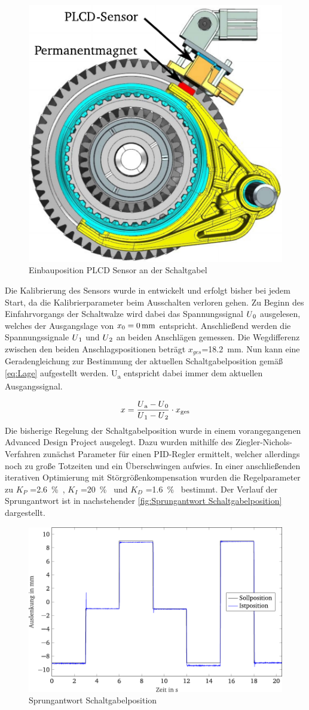 \begin{figure}[h]
	\centering
		\includegraphics[width=0.35\columnwidth]{Bilder/Sensor.pdf}
	\caption{Einbauposition PLCD Sensor an der Schaltgabel \cite[S.14]{adp}}
	\label{fig:Sensor}
\end{figure} \noindent
Die Kalibrierung des Sensors wurde in \cite[S.24f]{messtechnik} entwickelt und erfolgt bisher bei jedem Start, da die Kalibrierparameter beim Ausschalten verloren gehen. Zu Beginn des Einfahrvorgangs der Schaltwalze wird dabei das Spannungssignal $U\textsubscript{0}$ ausgelesen, welches der Ausgangslage von $x\textsubscript{0}=\SI{0}{mm}$ entspricht. Anschließend werden die Spannungssignale $U\textsubscript{1}$ und $U\textsubscript{2}$ an beiden Anschlägen gemessen. Die Wegdifferenz zwischen den beiden Anschlagspositionen beträgt $x_{ges}$=\SI{18,2}{mm}. Nun kann eine Geradengleichung zur Bestimmung der aktuellen Schaltgabelposition gemäß \autoref{eq:Lage} aufgestellt werden. U\textsubscript{a} entspricht dabei immer dem aktuellen Ausgangssignal.

\begin{equation}\label{eq:Lage}
	x=\frac{U\textsubscript{a} -U\textsubscript{0}}{U\textsubscript{1}-U\textsubscript{2}}\cdot x\textsubscript{ges}
\end{equation}
\noindent
Die bisherige Regelung der Schaltgabelposition wurde in einem vorangegangenen Advanced Design Project ausgelegt. Dazu wurden mithilfe des Ziegler-Nichols-Verfahren zunächst Parameter für einen PID-Regler ermittelt, welcher allerdings noch zu große Totzeiten und ein Überschwingen aufwies. In einer anschließenden iterativen Optimierung mit Störgrößenkompensation wurden die Regelparameter zu $K_P$ =\SI{2,6}{\%}, $K_I$ =\SI{20}{\%} und $K_D$ =\SI{1,6}{\%} bestimmt. Der Verlauf der Sprungantwort ist in nachstehender \autoref{fig:Sprungantwort Schaltgabelposition} dargestellt.
\begin{figure}[h]
	\centering
		\includegraphics[width=0.6\columnwidth]{Bilder/SprungantwortSchaltgabelposition.pdf}
	\caption{Sprungantwort Schaltgabelposition \cite[S.35]{adp}}
	\label{fig:Sprungantwort Schaltgabelposition}
\end{figure} \noindent

